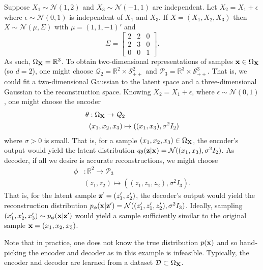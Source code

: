 \documentclass[11pt]{article}
\begin{document}
\begin{tcolorbox}[title={\centering\textbf{VAE example}}, colback=myLightBlue, colbacktitle=myDarkBlue, colframe=myDarkBlue, coltitle=white]
    Suppose $X_1\sim\mathcal{N}(1,2)$ and $X_3\sim\mathcal{N}(-1,1)$ are independent. Let $X_2=X_1+\epsilon$ where $\epsilon\sim\mathcal{N}(0,1)$ is independent of $X_1$ and $X_3$. If $X=(X_1,X_2,X_3)$ then $X\sim\mathcal{N}(\mu,\Sigma)$ with $\mu=(1,1,-1)'$ and
    $$
    \Sigma
    =
    \begin{bmatrix}
        2 & 2 & 0\\
        2 & 3 & 0\\
        0 & 0 & 1
    \end{bmatrix}.
    $$
    As such, $\Omega_{\mathbf{X}}=\mathbb{R}^3$. To obtain two-dimensional representations of samples $\mathbf{x}\in\Omega_{\mathbf{X}}$ (so $d=2$), one might choose $\mathcal{Q}_2=\mathbb{R}^2\times\mathcal{S}_{++}^2$ and $\mathcal{P}_3=\mathbb{R}^3\times\mathcal{S}_{++}^3$. That is, we could fit a two-dimensional Gaussian to the latent space and a three-dimensional Gaussian to the reconstruction space. Knowing $X_2=X_1+\epsilon$, where $\epsilon\sim\mathcal{N}(0,1)$, one might choose the encoder
    \begin{align*}
        \theta&:
        \Omega_{\mathbf{X}}\to\mathcal{Q}_2\\
        &(x_1,x_2,x_3)\mapsto((x_1,x_3),\sigma^2I_2)
    \end{align*}
    where $\sigma>0$ is small. That is, for a sample $(x_1,x_2,x_3)\in\Omega_{\mathbf{X}}$, the encoder's output would yield the latent distribution $q_{\theta}(\mathbf{z}|\mathbf{x})=\mathcal{N}((x_1,x_3),\sigma^2I_2)$. As decoder, if all we desire is accurate reconstructions, we might choose
    \begin{align*}
        \phi&:
        \mathbb{R}^2\to\mathcal{P}_3\\
        &(z_1,z_2)\mapsto((z_1,z_1,z_2), \sigma^2I_3).
    \end{align*}
    That is, for the latent sample $\mathbf{z}'=(z_1',z_2')$, the decoder's output would yield the reconstruction distribution $p_{\phi}(\mathbf{x}|\mathbf{z}')=\mathcal{N}((z_1',z_1',z_2'),\sigma^2I_3)$. Ideally, sampling $(x_1',x_2',x_3')\sim p_{\phi}(\mathbf{x}|\mathbf{z}')$ would yield a sample sufficiently similar to the original sample $\mathbf{x}=(x_1,x_2,x_3)$.

    \hspace{15pt} Note that in practice, one does not know the true distribution $p(\mathbf{x})$ and so hand-picking the encoder and decoder as in this example is infeasible. Typically, the encoder and decoder are learned from a dataset $\mathcal{D}\subset\Omega_{\mathbf{X}}$.
\end{tcolorbox}
\end{document}
